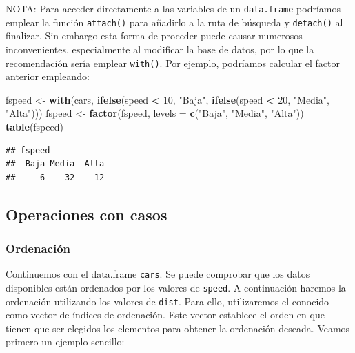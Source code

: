 \documentclass[
]{book}
\newenvironment{Shaded}{\begin{snugshade}}{\end{snugshade}}
\newcommand{\AttributeTok}[1]{\textcolor[rgb]{0.13,0.29,0.53}{#1}}
\newcommand{\DecValTok}[1]{\textcolor[rgb]{0.00,0.00,0.81}{#1}}
\newcommand{\FunctionTok}[1]{\textcolor[rgb]{0.13,0.29,0.53}{\textbf{#1}}}
\newcommand{\NormalTok}[1]{#1}
\newcommand{\OtherTok}[1]{\textcolor[rgb]{0.56,0.35,0.01}{#1}}
\newcommand{\SpecialCharTok}[1]{\textcolor[rgb]{0.81,0.36,0.00}{\textbf{#1}}}
\newcommand{\StringTok}[1]{\textcolor[rgb]{0.31,0.60,0.02}{#1}}
\theoremstyle{break}
\theoremstyle{nonumberplain}
\begin{document}
NOTA: Para acceder directamente a las variables de un \texttt{data.frame} podríamos emplear la función \texttt{attach()} para añadirlo a la ruta de búsqueda y \texttt{detach()} al finalizar.
Sin embargo esta forma de proceder puede causar numerosos inconvenientes, especialmente al modificar la base de datos, por lo que la recomendación sería emplear \texttt{with()}.
Por ejemplo, podríamos calcular el factor anterior empleando:

\begin{Shaded}
\begin{Highlighting}[]
\NormalTok{fspeed }\OtherTok{\textless{}{-}} \FunctionTok{with}\NormalTok{(cars, }\FunctionTok{ifelse}\NormalTok{(speed }\SpecialCharTok{\textless{}} \DecValTok{10}\NormalTok{, }\StringTok{"Baja"}\NormalTok{,}
                 \FunctionTok{ifelse}\NormalTok{(speed }\SpecialCharTok{\textless{}} \DecValTok{20}\NormalTok{, }\StringTok{"Media"}\NormalTok{, }\StringTok{"Alta"}\NormalTok{)))}
\NormalTok{fspeed }\OtherTok{\textless{}{-}} \FunctionTok{factor}\NormalTok{(fspeed, }\AttributeTok{levels =} \FunctionTok{c}\NormalTok{(}\StringTok{"Baja"}\NormalTok{, }\StringTok{"Media"}\NormalTok{, }\StringTok{"Alta"}\NormalTok{))}
\FunctionTok{table}\NormalTok{(fspeed)}
\end{Highlighting}
\end{Shaded}

\begin{verbatim}
## fspeed
##  Baja Media  Alta 
##     6    32    12
\end{verbatim}

\subsection{Operaciones con casos}\label{operaciones-con-casos}

\subsubsection{Ordenación}\label{ordenaciuxf3n}

Continuemos con el data.frame \texttt{cars}.
Se puede comprobar que los datos disponibles están ordenados por
los valores de \texttt{speed}. A continuación haremos la ordenación utilizando
los valores de \texttt{dist}. Para ello, utilizaremos el conocido como vector de
índices de ordenación.
Este vector establece el orden en que tienen que ser elegidos los
elementos para obtener la ordenación deseada.
Veamos primero un ejemplo sencillo:
\end{document}
